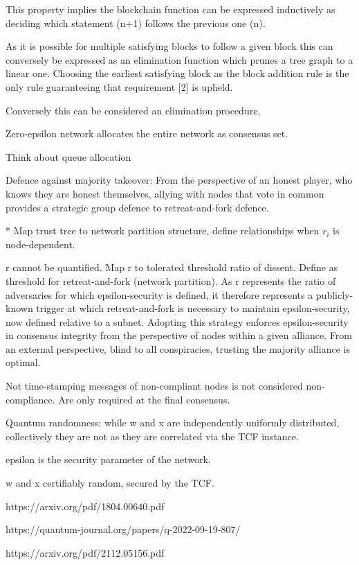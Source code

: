 This property implies the blockchain function can be expressed inductively as deciding which statement (n+1) follows the previous one (n).

As it is possible for multiple satisfying blocks to follow a given block this can conversely be expressed as an elimination function which prunes a tree graph to a linear one. Choosing the earliest satisfying block as the block addition rule is the only rule guaranteeing that requirement [2] is upheld.

Conversely this can be considered an elimination procedure,

Zero-epsilon network allocates the entire network as consensus set.

Think about queue allocation

Defence against majority takeover:
From the perspective of an honest player, who knows they are honest themselves, allying with nodes that vote in common provides a strategic group defence to retreat-and-fork defence.

* Map trust tree to network partition structure, define relationships when $r_i$ is node-dependent.

r cannot be quantified. Map r to tolerated threshold ratio of dissent. Define as threshold for retreat-and-fork (network partition). As r represents the ratio of adversaries for which epsilon-security is defined, it therefore represents a publicly-known trigger at which retreat-and-fork is necessary to maintain epsilon-security, now defined relative to a subnet. Adopting this strategy enforces epsilon-security in consensus integrity from the perspective of nodes within a given alliance. From an external perspective, blind to all conspiracies, trusting the majority alliance is optimal.

Not time-stamping messages of non-compliant nodes is not considered non-compliance. Are only required at the final consensus.

Quantum randomness: while w and x are independently uniformly distributed, collectively they are not as they are correlated via the TCF instance.

epsilon is the security parameter of the network.

w and x certifiably random, secured by the TCF.

https://arxiv.org/pdf/1804.00640.pdf

https://quantum-journal.org/papers/q-2022-09-19-807/

https://arxiv.org/pdf/2112.05156.pdf

